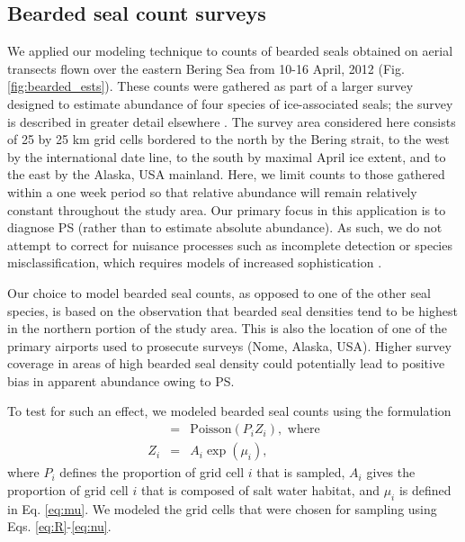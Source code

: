 \documentclass[times,mee,doublespace,]{besauth2}
\begin{document}
\subsection{Bearded seal count surveys}

We applied our modeling technique to counts of bearded seals obtained on aerial transects flown over the eastern Bering Sea from 10-16 April, 2012 (Fig. \ref{fig:bearded_ests}). These counts were gathered as part of a larger survey designed to estimate abundance of four species of ice-associated seals; the survey is described in greater detail elsewhere \citep{ConnEtAl2014,ConnEtAl2015}. The survey area considered here consists of 25 by 25 km grid cells bordered to the north by the Bering strait, to the west by the international date line, to the south by maximal April ice extent, and to the east by the Alaska, USA mainland. Here, we limit counts to those gathered within a one week period so that relative abundance will remain relatively constant throughout the study area.  Our primary focus in this application is to diagnose PS (rather than to estimate absolute abundance).  As such, we do not attempt to correct for nuisance processes such as incomplete detection or species misclassification, which requires models of increased sophistication \citep{ConnEtAl2014}.

Our choice to model bearded seal counts, as opposed to one of the other seal species, is based on the observation that bearded seal densities tend to be highest in the northern portion of the study area. This is also the location of one of the primary airports used to prosecute surveys (Nome, Alaska, USA).  Higher survey coverage in areas of high bearded seal density could potentially lead to positive bias in apparent abundance owing to PS.

To test for such an effect, we modeled bearded seal counts using the formulation
\begin{eqnarray*}
  [Y_i|Z_i] & = & \textrm{Poisson}(P_i Z_i), \text{ where}\\
  Z_i & = & A_i \exp(\mu_i),
 \end{eqnarray*}
where $P_i$ defines the proportion of grid cell $i$ that is sampled, $A_i$ gives the proportion of grid cell $i$ that is composed of salt water habitat, and $\mu_i$ is defined in Eq. \ref{eq:mu}.
We modeled the grid cells that were chosen for sampling using Eqs. \ref{eq:R}-\ref{eq:nu}.
\end{document}
